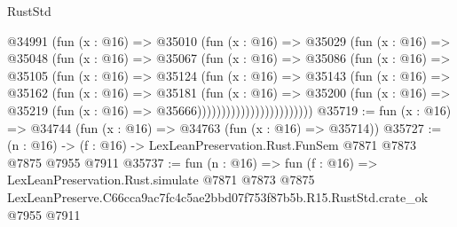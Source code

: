 \begin{lexlean}{RustStd}
\begin{coremodule}
                        @34991
                          (fun (x : @16) =>
                          @35010
                            (fun (x : @16) =>
                            @35029
                              (fun (x : @16) =>
                              @35048
                                (fun (x : @16) =>
                                @35067
                                  (fun (x : @16) =>
                                  @35086
                                    (fun (x : @16) =>
                                    @35105
                                      (fun (x : @16) =>
                                      @35124
                                        (fun (x : @16) =>
                                        @35143
                                          (fun (x : @16) =>
                                          @35162
                                            (fun (x : @16) =>
                                            @35181
                                              (fun (x : @16) =>
                                              @35200
                                                (fun (x : @16) =>
                                                @35219
                                                  (fun (x : @16) => @35666))))))))))))))))))))))))
@35719 := fun (x : @16) => @34744 (fun (x : @16) => @34763 (fun (x : @16) => @35714))
@35727 := (n : @16) -> (f : @16) -> LexLeanPreservation.Rust.FunSem @7871 @7873 @7875 @7955 @7911
@35737 := fun (n : @16) =>
  fun (f : @16) =>
  LexLeanPreservation.Rust.simulate
    @7871
    @7873
    @7875
    LexLeanPreserve.C66cca9ac7fc4c5ae2bbd07f753f87b5b.R15.RustStd.crate_ok
    @7955
    @7911
\end{coremodule}
\end{lexlean}
